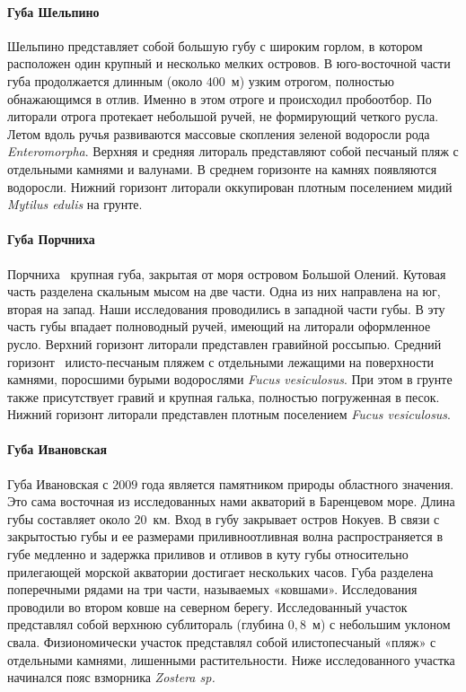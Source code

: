 \documentclass[12pt, a4paper]{disser}
\begin{document}
    \paragraph{Губа Шельпино}
Шельпино   представляет   собой   большую   губу   с   широким   горлом,   в   котором расположен   один   крупный   и   несколько   мелких   островов.   
В   юго-восточной   части   губа продолжается   длинным   (около   $400$~м)   узким   отрогом,   полностью   обнажающимся   в   отлив. 
Именно в этом отроге и происходил пробоотбор. 
По   литорали   отрога   протекает   небольшой   ручей,   не   формирующий   четкого   русла. 
Летом вдоль ручья развиваются массовые скопления зеленой водоросли рода  {\it Enteromorpha}. 
Верхняя и средняя литораль представляют собой песчаный пляж с отдельными камнями и валунами. 
В среднем горизонте на камнях появляются водоросли. 
Нижний горизонт литорали оккупирован плотным поселением мидий {\it Mytilus edulis} на грунте.

    \paragraph{Губа Порчниха}
Порчниха  \textemdash\  крупная   губа,   закрытая   от   моря   островом   Большой   Олений.   
Кутовая часть разделена скальным мысом на две части. 
Одна из них направлена на юг, вторая на запад. 
Наши   исследования   проводились   в   западной   части   губы.   
В   эту   часть   губы   впадает полноводный ручей, имеющий на литорали оформленное русло. 
Верхний горизонт литорали представлен   гравийной   россыпью.   
Средний   горизонт   \textemdash\   илисто-песчаным   пляжем   с отдельными   лежащими   на   поверхности   камнями,   поросшими   бурыми   водорослями  {\it Fucus vesiculosus}.   
При   этом   в   грунте   также   присутствует   гравий   и   крупная   галька,   полностью погруженная в песок. 
Нижний горизонт литорали представлен плотным поселением   {\it Fucus  vesiculosus}.

    \paragraph{Губа Ивановская}
Губа Ивановская с $2009$ года является памятником природы областного значения. 
Это сама восточная из исследованных нами акваторий в Баренцевом море. 
Длина губы составляет около $20$~км. 
Вход в губу закрывает  остров Нокуев.
В связи с  закрытостью губы и ее размерами приливно­отливная волна   распространяется   в   губе   медленно   и   задержка   приливов   и   отливов   в   куту   губы относительно прилегающей морской акватории достигает нескольких часов. 
Губа   разделена   поперечными   рядами   на   три   части,   называемых   «ковшами». 
Исследования   проводили   во   втором   ковше   на   северном   берегу.   
Исследованный   участок представлял   собой   верхнюю   сублитораль   (глубина   $0,8$~м)   с   небольшим   уклоном   свала. 
Физиономически участок представлял собой илисто­песчаный «пляж» с отдельными камнями, лишенными растительности. 
Ниже исследованного участка начинался пояс взморника {\it Zostera  sp.} 
\end{document}
